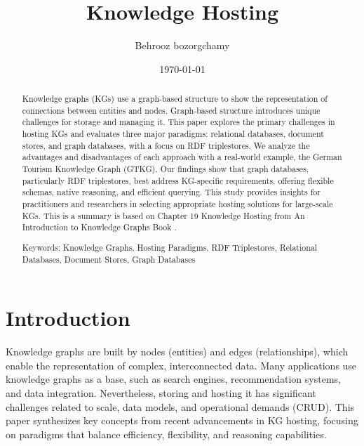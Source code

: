 \documentclass[12pt]{article}
\begin{document}
\title{Knowledge Hosting}
\author{Behrooz bozorgchamy}
\date{\today}
\maketitle{}
\begin{abstract}
    Knowledge graphs (KGs) use a graph-based structure to show the representation of connections between entities and nodes. Graph-based structure introduces unique challenges for storage and managing it. This paper explores the primary challenges in hosting KGs and evaluates three major paradigms: relational databases, document stores, and graph databases, with a focus on RDF triplestores. We analyze the advantages and disadvantages of each approach with a real-world example, the German Tourism Knowledge Graph (GTKG)\cite{serles2024germantourismknowledgegraph}. Our findings show that graph databases, particularly RDF triplestores, best address KG-specific requirements, offering flexible schemas, native reasoning, and efficient querying. This study provides insights for practitioners and researchers in selecting appropriate hosting solutions for large-scale KGs. 
    This is a summary is based on Chapter 19 Knowledge Hosting from An Introduction to Knowledge Graphs Book \cite{serles2024introduction}. 

    Keywords: Knowledge Graphs, Hosting Paradigms, RDF Triplestores, Relational Databases, Document Stores, Graph Databases
\end{abstract}

\section{Introduction}
Knowledge graphs are built by nodes (entities) and edges (relationships), which enable the representation of complex, interconnected data. Many applications use knowledge graphs as a base, such as search engines, recommendation systems, and data integration. Nevertheless, storing and hosting it has significant challenges related to scale, data models, and operational demands (CRUD). This paper synthesizes key concepts from recent advancements in KG hosting, focusing on paradigms that balance efficiency, flexibility, and reasoning capabilities.
\end{document}
